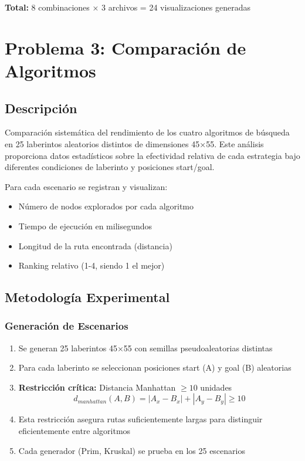 \documentclass[12pt,a4paper]{article}
\begin{document}
\textbf{Total:} 8 combinaciones × 3 archivos = 24 visualizaciones generadas

\section{Problema 3: Comparación de Algoritmos}

\subsection{Descripción}

Comparación sistemática del rendimiento de los cuatro algoritmos de búsqueda en 25 laberintos aleatorios distintos de dimensiones 45×55. Este análisis proporciona datos estadísticos sobre la efectividad relativa de cada estrategia bajo diferentes condiciones de laberinto y posiciones start/goal.

Para cada escenario se registran y visualizan:
\begin{itemize}
    \item Número de nodos explorados por cada algoritmo
    \item Tiempo de ejecución en milisegundos
    \item Longitud de la ruta encontrada (distancia)
    \item Ranking relativo (1-4, siendo 1 el mejor)
\end{itemize}

\subsection{Metodología Experimental}

\subsubsection{Generación de Escenarios}

\begin{enumerate}
    \item Se generan 25 laberintos 45×55 con semillas pseudoaleatorias distintas
    \item Para cada laberinto se seleccionan posiciones start (A) y goal (B) aleatorias
    \item \textbf{Restricción crítica:} Distancia Manhattan $\geq 10$ unidades
    \begin{equation}
        d_{manhattan}(A, B) = |A_x - B_x| + |A_y - B_y| \geq 10
    \end{equation}
    \item Esta restricción asegura rutas suficientemente largas para distinguir eficientemente entre algoritmos
    \item Cada generador (Prim, Kruskal) se prueba en los 25 escenarios
\end{enumerate}
\end{document}

